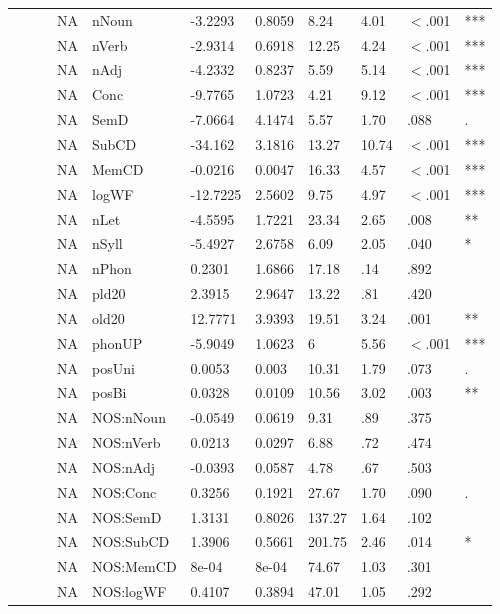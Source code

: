 \begin{table}[ht]
\begin{tabular}{lllllllllll}
   &  &  & NA & nNoun & -3.2293 & 0.8059 & 8.24 & 4.01 & $<$.001 & *** \\ 
   &  &  & NA & nVerb & -2.9314 & 0.6918 & 12.25 & 4.24 & $<$.001 & *** \\ 
   &  &  & NA & nAdj & -4.2332 & 0.8237 & 5.59 & 5.14 & $<$.001 & *** \\ 
   &  &  & NA & Conc & -9.7765 & 1.0723 & 4.21 & 9.12 & $<$.001 & *** \\ 
   &  &  & NA & SemD & -7.0664 & 4.1474 & 5.57 & 1.70 & .088 & . \\ 
   &  &  & NA & SubCD & -34.162 & 3.1816 & 13.27 & 10.74 & $<$.001 & *** \\ 
   &  &  & NA & MemCD & -0.0216 & 0.0047 & 16.33 & 4.57 & $<$.001 & *** \\ 
   &  &  & NA & logWF & -12.7225 & 2.5602 & 9.75 & 4.97 & $<$.001 & *** \\ 
   &  &  & NA & nLet & -4.5595 & 1.7221 & 23.34 & 2.65 & .008 & ** \\ 
   &  &  & NA & nSyll & -5.4927 & 2.6758 & 6.09 & 2.05 & .040 & * \\ 
   &  &  & NA & nPhon & 0.2301 & 1.6866 & 17.18 & .14 & .892 &   \\ 
   &  &  & NA & pld20 & 2.3915 & 2.9647 & 13.22 & .81 & .420 &   \\ 
   &  &  & NA & old20 & 12.7771 & 3.9393 & 19.51 & 3.24 & .001 & ** \\ 
   &  &  & NA & phonUP & -5.9049 & 1.0623 & 6 & 5.56 & $<$.001 & *** \\ 
   &  &  & NA & posUni & 0.0053 & 0.003 & 10.31 & 1.79 & .073 & . \\ 
   &  &  & NA & posBi & 0.0328 & 0.0109 & 10.56 & 3.02 & .003 & ** \\ 
   &  &  & NA & NOS:nNoun & -0.0549 & 0.0619 & 9.31 & .89 & .375 &   \\ 
   &  &  & NA & NOS:nVerb & 0.0213 & 0.0297 & 6.88 & .72 & .474 &   \\ 
   &  &  & NA & NOS:nAdj & -0.0393 & 0.0587 & 4.78 & .67 & .503 &   \\ 
   &  &  & NA & NOS:Conc & 0.3256 & 0.1921 & 27.67 & 1.70 & .090 & . \\ 
   &  &  & NA & NOS:SemD & 1.3131 & 0.8026 & 137.27 & 1.64 & .102 &   \\ 
   &  &  & NA & NOS:SubCD & 1.3906 & 0.5661 & 201.75 & 2.46 & .014 & * \\ 
   &  &  & NA & NOS:MemCD & 8e-04 & 8e-04 & 74.67 & 1.03 & .301 &   \\ 
   &  &  & NA & NOS:logWF & 0.4107 & 0.3894 & 47.01 & 1.05 & .292 &   \\ 

\end{tabular}
\end{table}
